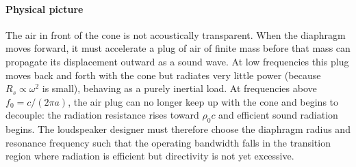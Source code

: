 \paragraph{Physical picture} The air in front of the cone is not acoustically transparent. When the diaphragm moves forward, it must accelerate a plug of air of finite mass before that mass can propagate its displacement outward as a sound wave. At low frequencies this plug moves back and forth with the cone but radiates very little power (because \(R_s \propto \omega^2\) is small), behaving as a purely inertial load. At frequencies above \(f_0 = c/(2\pi a)\), the air plug can no longer keep up with the cone and begins to decouple: the radiation resistance rises toward \(\rho_0 c\) and efficient sound radiation begins. The loudspeaker designer must therefore choose the diaphragm radius and resonance frequency such that the operating bandwidth falls in the transition region where radiation is efficient but directivity is not yet excessive.
